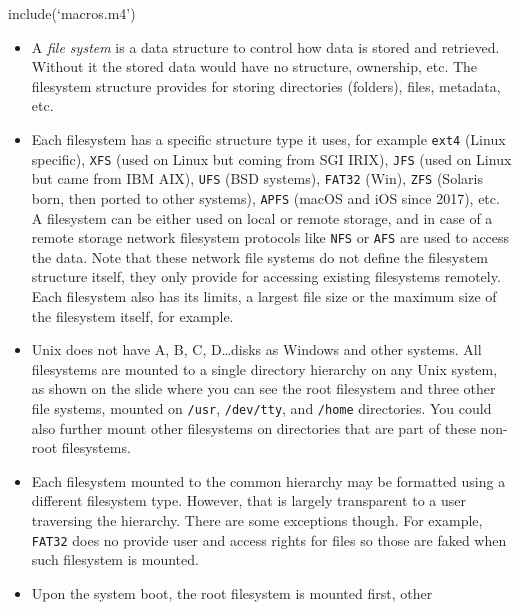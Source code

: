 
include(`macros.m4')


\begin{slide}
\begin{center}

\end{center}
\end{slide}

\begin{itemize}
\item A \emph{file system} is a data structure to control how data is stored and
retrieved.  Without it the stored data would have no structure, ownership, etc.
The filesystem structure provides for storing directories (folders), files,
metadata, etc.
\item Each filesystem has a specific structure type it uses, for example
\texttt{ext4} (Linux specific), \texttt{XFS} (used on Linux but coming from SGI
IRIX), \texttt{JFS} (used on Linux but came from IBM AIX), \texttt{UFS} (BSD
systems), \texttt{FAT32} (Win), \texttt{ZFS} (Solaris born, then ported to other
systems), \texttt{APFS} (macOS and iOS since 2017), etc.  A filesystem can be
either used on local or remote storage, and in case of a remote storage network
filesystem protocols like \texttt{NFS} or \texttt{AFS} are used to access the
data.  Note that these network file systems do not define the filesystem
structure itself, they only provide for accessing existing filesystems remotely.
Each filesystem also has its limits, a largest file size or the maximum size of
the filesystem itself, for example.
\item Unix does not have A, B, C, D\dots disks as Windows and other systems.
All filesystems are mounted to a single directory hierarchy on any Unix system,
as shown on the slide where you can see the root filesystem and three other
file systems, mounted on \texttt{/usr}, \texttt{/dev/tty}, and \texttt{/home}
directories.  You could also further mount other filesystems on directories that
are part of these non-root filesystems.
\item Each filesystem mounted to the common hierarchy may be formatted using a
different filesystem type.  However, that is largely transparent to a user
traversing the hierarchy.  There are some exceptions though.  For example,
\texttt{FAT32} does no provide user and access rights for files so those are
faked when such filesystem is mounted.
\item Upon the system boot, the root filesystem is mounted first, other

\end{itemize}
